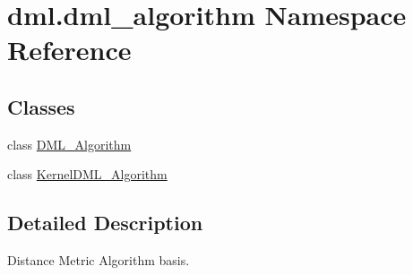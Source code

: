 \hypertarget{namespacedml_1_1dml__algorithm}{}\section{dml.\+dml\+\_\+algorithm Namespace Reference}
\label{namespacedml_1_1dml__algorithm}
\subsection*{Classes}
\begin{DoxyCompactItemize}
\item 
class \hyperlink{classdml_1_1dml__algorithm_1_1DML__Algorithm}{D\+M\+L\+\_\+\+Algorithm}
\item 
class \hyperlink{classdml_1_1dml__algorithm_1_1KernelDML__Algorithm}{Kernel\+D\+M\+L\+\_\+\+Algorithm}
\end{DoxyCompactItemize}


\subsection{Detailed Description}
\begin{DoxyVerb}Distance Metric Algorithm basis.\end{DoxyVerb}
 